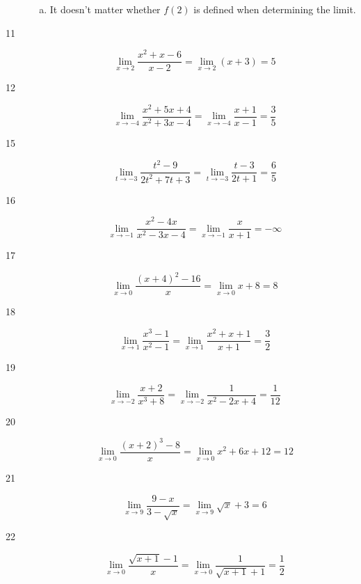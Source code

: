 \documentclass[letterpaper, landscape]{exam}
\begin{document}
\begin{description}
\begin{enumerate}[(a)]
          \item It doesn't matter whether $f(2)$ is defined when determining the
            limit.
        \end{enumerate}

      \item[11]
        \[
          \lim_{x \to 2} \frac{x^2 + x - 6}{x - 2} 
            = \lim_{x \to 2} (x + 3) = \boxed{ 5 } 
        \]

      \item[12]
        \[
          \lim_{x \to -4} \frac{x^2+5 x+4}{x^2+3 x-4} 
            = \lim_{x \to -4} \frac{x+1}{x-1} = \boxed{ \frac{3}{5} } 
        \]

      \item[15]
        \[
          \lim_{t \to -3} \frac{t^2-9}{2 t^2+7 t+3}            
            = \lim_{t \to -3} \frac{t-3}{2 t+1} = \boxed{ \frac{6}{5} } 
        \]

      \item[16]
        \[
          \lim_{x \to -1} \frac{x^2-4 x}{x^2-3 x-4} 
            = \lim_{x \to -1} \frac{x}{x+1} = \boxed{ -\infty } 
        \]

      \item[17]
        \[
          \lim_{x \to 0} \frac{(x+4)^2-16}{x} 
            = \lim_{x \to 0} x + 8 = \boxed{ 8 } 
        \]

      \item[18]
        \[
          \lim_{x \to 1} \frac{x^3-1}{x^2-1} 
            = \lim_{x \to 1} \frac{x^2+x+1}{x+1} = \boxed{ \frac{3}{2} } 
        \]

      \item[19]
        \[
          \lim_{x \to -2} \frac{x+2}{x^3+8} 
            = \lim_{x \to -2} \frac{1}{x^2-2 x+4} = \boxed{ \frac{1}{12} } 
        \]

      \item[20]
        \[
          \lim_{x \to 0} \frac{(x+2)^3-8}{x} 
            = \lim_{x \to 0} x^2+6 x+12 = \boxed{ 12 } 
        \]

      \item[21]
        \[
          \lim_{x \to 9} \frac{9-x}{3-\sqrt{x}} 
            = \lim_{x \to 9} \sqrt{x}+3 = \boxed{ 6 } 
        \]

      \item[22]
        \[
          \lim_{x \to 0} \frac{\sqrt{x+1}-1}{x} 
            = \lim_{x \to 0} \frac{1}{\sqrt{x + 1} + 1} 
            = \boxed{ \frac{1}{2} } 
        \]


\end{description}
\end{document}

